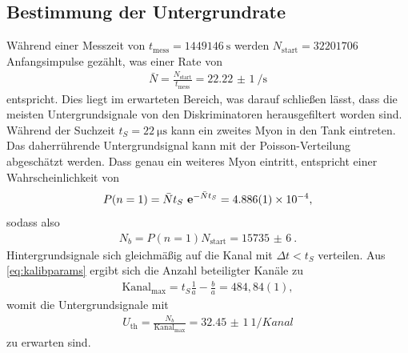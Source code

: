 \subsection{Bestimmung der Untergrundrate}
Während einer Messzeit von $t_\text{mess}=\SI{1449146}{\second}$ werden $N_\text{start}=\SI{32201706}{}$ Anfangsimpulse gezählt, was einer Rate von 
\begin{align}
 \bar N = \frac{N_\text{start}}{t_\text{mess}} = \SI{22,22(1)}{\per\second}
\end{align}
entspricht. Dies liegt im erwarteten Bereich, was darauf schließen lässt, dass die meisten Untergrundsignale von den Diskriminatoren herausgefiltert
worden sind. Während der Suchzeit $t_S=\SI{22}{\micro\second}$ kann ein zweites Myon in den Tank eintreten. Das daherrührende Untergrundsignal kann
mit der Poisson-Verteilung abgeschätzt werden. Dass genau ein weiteres Myon eintritt, entspricht einer Wahrscheinlichkeit von
\begin{align}
 P(n=1) = \bar N t_S \e^{-\bar N t_S} = \SI{4,886(1)e-4}{},
\end{align}
sodass also 
\begin{align}
 N_b = P(n=1)N_\text{start} = \SI{15735(6)}{}.
\end{align}
Hintergrundsignale sich gleichmäßig auf die Kanal mit $\Delta t < t_S$ verteilen. Aus \eqref{eq:kalibparams} ergibt sich die Anzahl beteiligter 
Kanäle zu
\begin{align}
 \text{Kanal}_\text{max} = t_S\frac{1}{a} - \frac{b}{a}  = 484,84(1),
\end{align}
womit die Untergrundsignale mit
\begin{align}
 U_\text{th} = \frac{N_b}{\text{Kanal}_\text{max}} = \SI{32,45(1)}{1\per Kanal}
 \label{eq:backgrTh}
\end{align}
zu erwarten sind.

